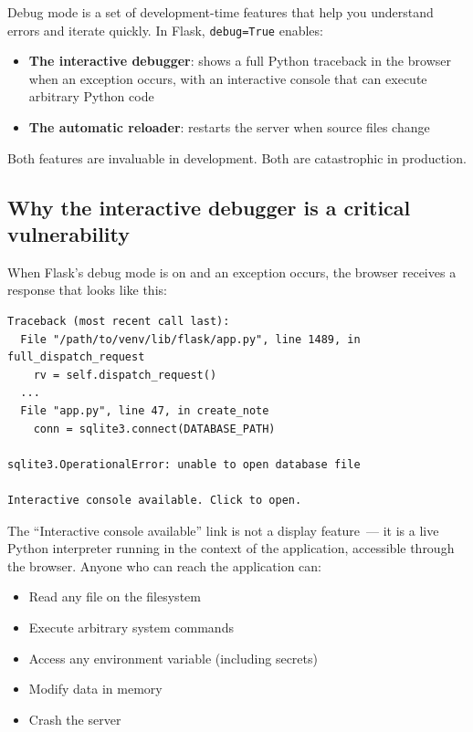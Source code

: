 Debug mode is a set of development-time features that help you understand errors and iterate quickly. In Flask, \texttt{debug=True} enables:

\begin{itemize}
\tightlist
\item
  \textbf{The interactive debugger}: shows a full Python traceback in the browser when an exception occurs, with an interactive console that can execute arbitrary Python code
\item
  \textbf{The automatic reloader}: restarts the server when source files change
\end{itemize}

\noindent{}Both features are invaluable in development. Both are catastrophic in production.

\subsection*{Why the interactive debugger is a critical vulnerability}\label{09-configuration-coupling:why-the-interactive-debugger-is-a-critical-vulnerability}

When Flask's debug mode is on and an exception occurs, the browser receives a response that looks like this:

\begin{outputbox}[short]
\begin{Verbatim}[fontsize=\codesize, breaklines, breakanywhere, breaksymbolleft={\tiny\textcolor{muted}{$\hookrightarrow$}}]
Traceback (most recent call last):
  File "/path/to/venv/lib/flask/app.py", line 1489, in full_dispatch_request
    rv = self.dispatch_request()
  ...
  File "app.py", line 47, in create_note
    conn = sqlite3.connect(DATABASE_PATH)

sqlite3.OperationalError: unable to open database file

Interactive console available. Click to open.
\end{Verbatim}
\end{outputbox}

\noindent{}The ``Interactive console available'' link is not a display feature~--- it is a live Python interpreter running in the context of the application, accessible through the browser. Anyone who can reach the application can:

\begin{itemize}
\tightlist
\item
  Read any file on the filesystem
\item
  Execute arbitrary system commands
\item
  Access any environment variable (including secrets)
\item
  Modify data in memory
\item
  Crash the server
\end{itemize}

